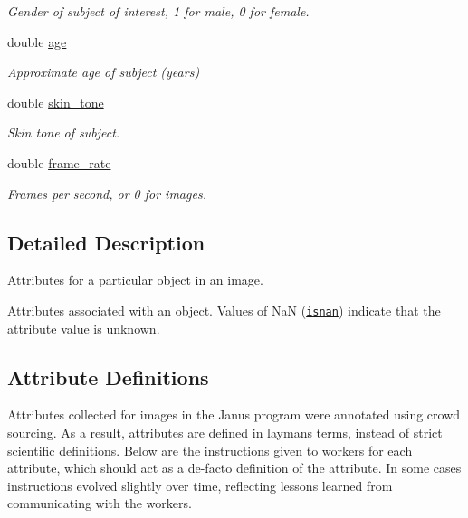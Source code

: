 \begin{DoxyCompactItemize}
\begin{DoxyCompactList}\small\item\em Gender of subject of interest, 1 for male, 0 for female. \end{DoxyCompactList}\item 
double \hyperlink{structjanus__attributes_a01a94401c6d970bae36256bd601417dc}{age}
\begin{DoxyCompactList}\small\item\em Approximate age of subject (years) \end{DoxyCompactList}\item 
double \hyperlink{structjanus__attributes_adb5a57d3ffd2d48c15daaf417da1a548}{skin\+\_\+tone}
\begin{DoxyCompactList}\small\item\em Skin tone of subject. \end{DoxyCompactList}\item 
\hypertarget{structjanus__attributes_a131779fc6f0017884cd80e7f5af87f72}{}double \hyperlink{structjanus__attributes_a131779fc6f0017884cd80e7f5af87f72}{frame\+\_\+rate}\label{structjanus__attributes_a131779fc6f0017884cd80e7f5af87f72}

\begin{DoxyCompactList}\small\item\em Frames per second, or 0 for images. \end{DoxyCompactList}\end{DoxyCompactItemize}


\subsection{Detailed Description}
Attributes for a particular object in an image. 

Attributes associated with an object. Values of {\ttfamily Na\+N} (\href{http://www.cplusplus.com/reference/cmath/isnan/}{\tt isnan}) indicate that the attribute value is unknown.\hypertarget{group__janus_attribute_definitions}{}\subsection{Attribute Definitions}\label{group__janus_attribute_definitions}
Attributes collected for images in the Janus program were annotated using crowd sourcing. As a result, attributes are defined in layman\textquotesingle{}s terms, instead of strict scientific definitions. Below are the instructions given to workers for each attribute, which should act as a de-\/facto definition of the attribute. In some cases instructions evolved slightly over time, reflecting lessons learned from communicating with the workers.

